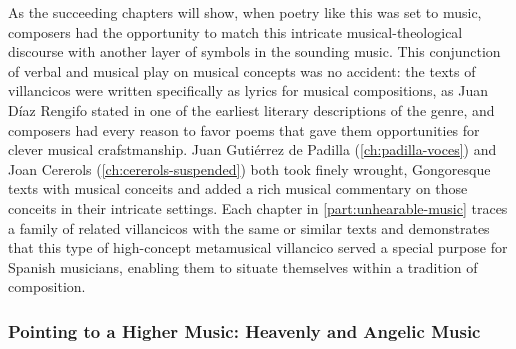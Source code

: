 
As the succeeding chapters will show, when poetry like this was set to music,
composers had the opportunity to match this intricate musical-theological
discourse with another layer of symbols in the sounding music.
This conjunction of verbal and musical play on musical concepts was no
accident: the texts of villancicos were written specifically as lyrics for
musical compositions, as Juan Díaz Rengifo stated in one of the earliest
literary descriptions of the genre, and composers had every reason to favor
poems that gave them opportunities for clever musical crafstmanship.%
    \Autocite{Rengifo:ArteMetrica}
Juan Gutiérrez de Padilla (\cref{ch:padilla-voces}) and Joan Cererols
(\cref{ch:cererols-suspended}) both took finely wrought, Gongoresque texts with
musical conceits and added a rich musical commentary on those conceits in their
intricate settings.
Each chapter in \cref{part:unhearable-music} traces a family of related
villancicos with the same or similar texts and demonstrates that this type of
high-concept metamusical villancico served a special purpose for Spanish
musicians, enabling them to situate themselves within a tradition of
composition.

\subsubsection{Pointing to a Higher Music: Heavenly and Angelic Music}

